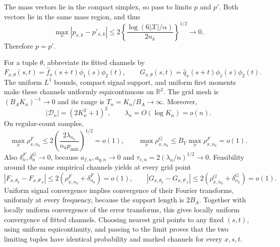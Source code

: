 The mass vectors lie in the compact simplex, so pass to limits \(p\) and \(p'\). Both vectors lie in the same mass region, and thus
\[
 \max_x|p_{x,k}-p'_{x,k}|
 \le2\left\{\frac{\log(6|\mathcal X|/\alpha)}{2n_k}\right\}^{1/2}
 \longrightarrow0.
\]
Therefore \(p=p'\).

For a tuple \(\theta\), abbreviate its fitted channels by
\[
 F_{x,\theta}(s,t)=\widehat f_x(s+t)\phi_1(s)\phi_2(t),
 \qquad
 G_{x,\theta}(s,t)=\widehat q_x(s+t)\phi_1(s)\phi_2(t).
\]
The uniform \(L^1\) bounds, compact signal support, and uniform first moments make these channels uniformly equicontinuous on \(\mathbb R^2\). The grid mesh is \((B_AK_n)^{-1}\to0\) and its range is \(T_n=K_n/B_A\to\infty\). Moreover,
\[
 |\mathcal D_n|=(2K_n^2+1)^2,
 \qquad \lambda_n=O(\log K_n)=o(n).
\]
On regular-count samples,
\[
 \max_x\rho^F_{x,n_k}
 \le2\left(\frac{2\lambda_{n_k}}{n_kp_{\min}}\right)^{1/2}=o(1),
 \qquad
 \max_x\rho^G_{x,n_k}\le B_Y\max_x\rho^F_{x,n_k}=o(1).
\]
Also \(\delta^F_n,\delta^G_n\to0\), because \(a_{f,n},a_{q,n}\to0\) and \(\tau_{e,n}=2(\lambda_n/n)^{1/2}\to0\). Feasibility around the same empirical channels yields at every grid point
\[
 |F_{x,\theta_k}-F_{x,\theta'_k}|
 \le2(\rho^F_{x,n_k}+\delta^F_{n_k})=o(1),
 \qquad
 |G_{x,\theta_k}-G_{x,\theta'_k}|
 \le2(\rho^G_{x,n_k}+\delta^G_{n_k})=o(1).
\]
Uniform signal convergence implies convergence of their Fourier transforms, uniformly at every frequency, because the support length is \(2B_A\). Together with locally uniform convergence of the error transforms, this gives locally uniform convergence of fitted channels. Choosing nearest grid points to any fixed \((s,t)\), using uniform equicontinuity, and passing to the limit proves that the two limiting tuples have identical probability and marked channels for every \(x,s,t\).

